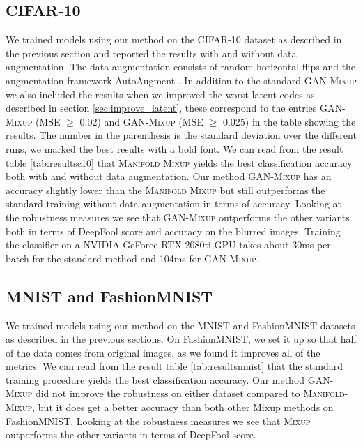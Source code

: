 \documentclass[nohyperref]{article}
\theoremstyle{plain}
\theoremstyle{definition}
\theoremstyle{remark}
\begin{document}
\subsection{\textsc{ CIFAR-10}}



We trained models using our method on the CIFAR-10 dataset as described in the previous section and reported the results with and without data augmentation. The data augmentation consists of random horizontal flips and the augmentation framework AutoAugment \cite{autoaug}. In addition to the standard \textsc{GAN-Mixup} we also included the results when we improved the worst latent codes as described in section \ref{sec:improve_latent}, these correspond to the entries \textsc{GAN-Mixup} (MSE $\geq$ 0.02) and \textsc{GAN-Mixup} (MSE $\geq$ 0.025) in the table showing the results.
The number in the parenthesis is the standard deviation over the different runs, we marked the best results with a bold font.
We can read from the result table \ref{tab:resultsc10} that \textsc{Manifold Mixup} yields the best classification accuracy both with and without data augmentation. Our method \textsc{GAN-Mixup} has an accuracy slightly lower than the \textsc{Manifold Mixup} but still outperforms the standard training without data augmentation in terms of accuracy. Looking at the robustness measures we see that \textsc{GAN-Mixup} outperforms the other variants both in terms of DeepFool score and accuracy on the blurred images. Training the classifier on a NVIDIA GeForce RTX 2080ti GPU takes about 30ms per batch for the standard method and 104ms for \textsc{GAN-Mixup}.


\subsection{MNIST and FashionMNIST}

We trained models using our method on the MNIST and FashionMNIST datasets as described in the previous sections. On FashionMNIST, we set it up so that half of the data comes from original images, as we found it improves all of the metrics.
We can read from the result table \ref{tab:resultsmnist} that the standard training procedure yields the best classification accuracy. Our method \textsc{GAN-Mixup} did not improve the robustness on either dataset compared to \textsc{Manifold-Mixup}, but it does get a better accuracy than both other Mixup methods on FashionMNIST. Looking at the robustness measures we see that \textsc{Mixup} outperforms the other variants in terms of DeepFool score.
\end{document}
